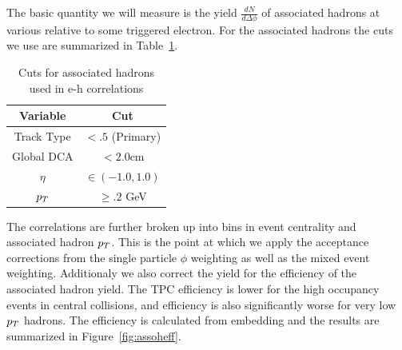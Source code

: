 The basic quantity we will measure is the yield $\frac{dN}{d\Delta\phi}$ of associated hadrons at various relative to some triggered electron. For the associated hadrons the cuts we use are summarized in Table~\ref{tab:assohcuts}.

\begin{table}
\centering
\begin{tabular}{|c|c|}
\hline
Variable			& Cut \\
\hline
Track Type          & $< .5$ (Primary) \\
\hline
Global DCA          & $< 2.0$cm \\
\hline
$\eta$              & $\in(-1.0, 1.0)$ \\
\hline
$p_{T}$               & $\geq .2$ GeV \\
\hline
\end{tabular}
\caption[Associated hadron cuts]{Cuts for associated hadrons used in e-h correlations}
\label{tab:assohcuts}
\end{table} 

The correlations are further broken up into bins in event centrality and associated hadron $p_{T}$. This is the point at which we apply the acceptance corrections from the single particle $\phi$ weighting as well as the mixed event weighting. Additionaly we also correct the yield for the efficiency of the associated hadron yield. The TPC efficiency is lower for the high occupancy events in central collisions, and efficiency is also significantly worse for very low $p_{T}$ hadrons. The efficiency is calculated from embedding and the results are summarized in Figure~\ref{fig:assoheff}.

